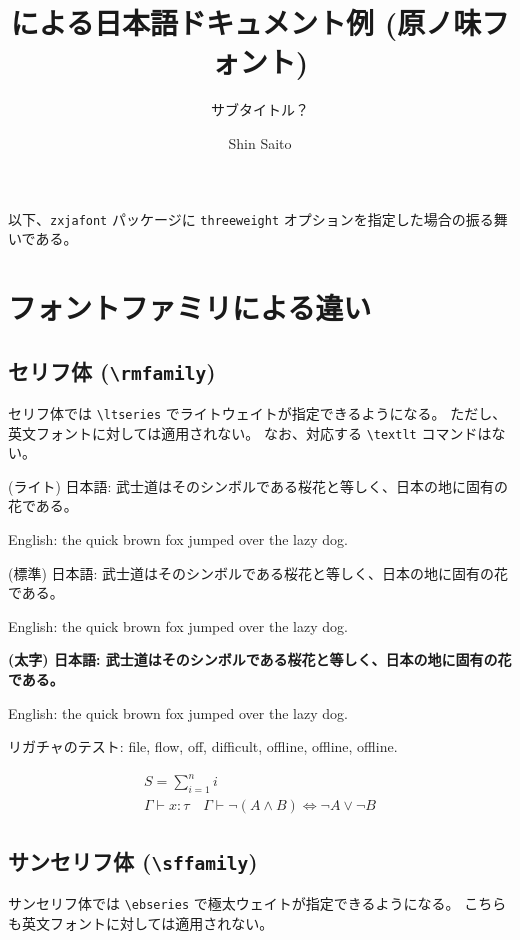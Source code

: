 \documentclass[xelatex,a4paper,ja=standard]{bxjsarticle}
\title{\XeLaTeX による日本語ドキュメント例 (原ノ味フォント)}
\subtitle{サブタイトル？}
\author{Shin Saito}
\newcommand{\jasample}{武士道はそのシンボルである桜花と等しく、日本の地に固有の花である。}
\begin{document}
\maketitle

以下、\texttt{zxjafont} パッケージに \texttt{threeweight} オプションを指定した場合の振る舞いである。

\section{フォントファミリによる違い}

\subsection{セリフ体 (\texttt{\textbackslash rmfamily})}

セリフ体では \texttt{\textbackslash ltseries} でライトウェイトが指定できるようになる。
ただし、英文フォントに対しては適用されない。
なお、対応する \texttt{\textbackslash textlt} コマンドはない。

\rmfamily\LARGE

{\ltseries (ライト) 日本語: \jasample

English: the quick brown fox jumped over the lazy dog.}

{\mdseries (標準) 日本語: \jasample

English: the quick brown fox jumped over the lazy dog.}

{\bfseries (太字) 日本語: \jasample

English: the quick brown fox jumped over the lazy dog.}

{\mdseries リガチャのテスト: file, flow, off, difficult, offline, off\/line, off\textcompwordmark line.}
 
\normalsize
\begin{gather*}
    S = \sum_{i=1}^n i \\
    \Gamma \vdash x \colon \tau \quad \Gamma \vdash {\neg(A\land B)} \iff {\neg A} \lor {\neg B}
\end{gather*}

\subsection{サンセリフ体 (\texttt{\textbackslash sffamily})}

サンセリフ体では \texttt{\textbackslash ebseries} で極太ウェイトが指定できるようになる。
こちらも英文フォントに対しては適用されない。

\sffamily\LARGE
\end{document}
